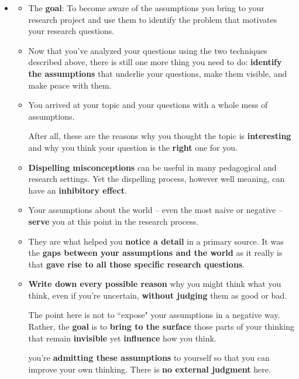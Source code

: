 \documentclass[11pt]{article}
\begin{document}
\begin{itemize}
\item \begin{exercise}
\begin{itemize}
\item The \textbf{goal}: To become aware of the assumptions you bring to your research project and use them to identify the problem that motivates your research questions.

\item Now that you’ve analyzed your questions using the two techniques described above, there is still one more thing you need to do: \textbf{identify the assumptions} that underlie your questions, make them visible, and make peace with them.

\item You arrived at your topic and your questions with a whole mess of assumptions.  

After all, these are the reasons why you thought the topic is \textbf{interesting} and why you think your question is the \textbf{right} one for you.

\item \textbf{Dispelling misconceptions} can be useful in many pedagogical and research settings. Yet the dispelling process, however well meaning, can have an \textbf{inhibitory effect}.

\item Your assumptions about the world -- even the most naive or negative -- \textbf{serve} you at this point in the research process. 

\item They are what helped you \textbf{notice a detail} in a primary source. It was the \textbf{gaps between your assumptions and the world} as it really is that \textbf{gave rise to all those specific research questions}. 


\item \textbf{Write down every possible reason} why you might think what you think, even if you’re uncertain, \textbf{without judging} them as good or bad. 

The point here is not to ``expose" your assumptions in a negative way. Rather, the \textbf{goal} is to \textbf{bring to the surface} those parts of your thinking that remain \textbf{invisible} yet \textbf{influence} how you think.

you’re \textbf{admitting these assumptions} to yourself so that you can improve your own thinking. There is \textbf{no external judgment} here.
\end{itemize}
\end{exercise}


\end{itemize}
\end{document}
